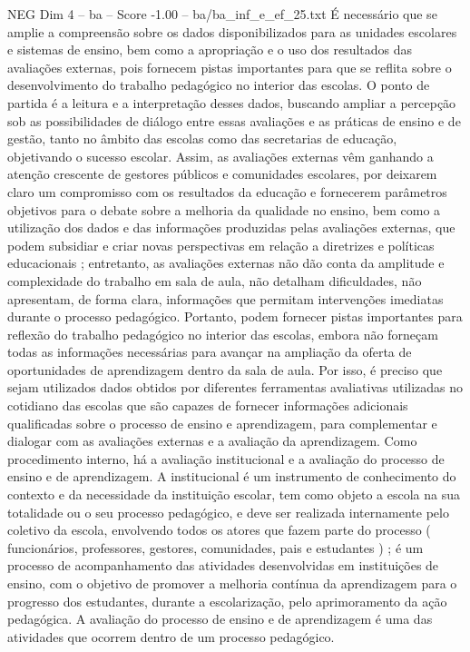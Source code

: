 \begin{textsample}{NEG Dim 4 – ba – Score -1.00 – ba/ba\_inf\_e\_ef\_25.txt}
É necessário que se amplie a compreensão sobre os dados disponibilizados para as unidades escolares e sistemas de ensino, bem como a apropriação e o uso dos resultados das avaliações externas, pois fornecem pistas importantes para que se reflita sobre o desenvolvimento do trabalho pedagógico no interior das escolas.
O ponto de partida é a leitura e a interpretação desses dados, buscando ampliar a percepção sob as possibilidades de diálogo entre essas avaliações e as práticas de ensino e de gestão, tanto no âmbito das escolas como das secretarias de educação, objetivando o sucesso escolar.
Assim, as avaliações externas vêm ganhando a atenção crescente de gestores públicos e comunidades escolares, por deixarem claro um compromisso com os resultados da educação e fornecerem parâmetros objetivos para o debate sobre a melhoria da qualidade no ensino, bem como a utilização dos dados e das informações produzidas pelas avaliações externas, que podem subsidiar e criar novas perspectivas em relação a diretrizes e políticas educacionais ; entretanto, as avaliações externas não dão conta da amplitude e complexidade do trabalho em sala de aula, não detalham dificuldades, não apresentam, de forma clara, informações que permitam intervenções imediatas durante o processo pedagógico.
Portanto, podem fornecer pistas importantes para reflexão do trabalho pedagógico no interior das escolas, embora não forneçam todas as informações necessárias para avançar na ampliação da oferta de oportunidades de aprendizagem dentro da sala de aula.
Por isso, é preciso que sejam utilizados dados obtidos por diferentes ferramentas avaliativas utilizadas no cotidiano das escolas que são capazes de fornecer informações adicionais qualificadas sobre o processo de ensino e aprendizagem, para complementar e dialogar com as avaliações externas e a avaliação da aprendizagem.
Como procedimento interno, há a avaliação institucional e a avaliação do processo de ensino e de aprendizagem.
A institucional é um instrumento de conhecimento do contexto e da necessidade da instituição escolar, tem como objeto a escola na sua totalidade ou o seu processo pedagógico, e deve ser realizada internamente pelo coletivo da escola, envolvendo todos os atores que fazem parte do processo ( funcionários, professores, gestores, comunidades, pais e estudantes ) ; é um processo de acompanhamento das atividades desenvolvidas em instituições de ensino, com o objetivo de promover a melhoria contínua da aprendizagem para o progresso dos estudantes, durante a escolarização, pelo aprimoramento da ação pedagógica.
A avaliação do processo de ensino e de aprendizagem é uma das atividades que ocorrem dentro de um processo pedagógico.

\end{textsample}
